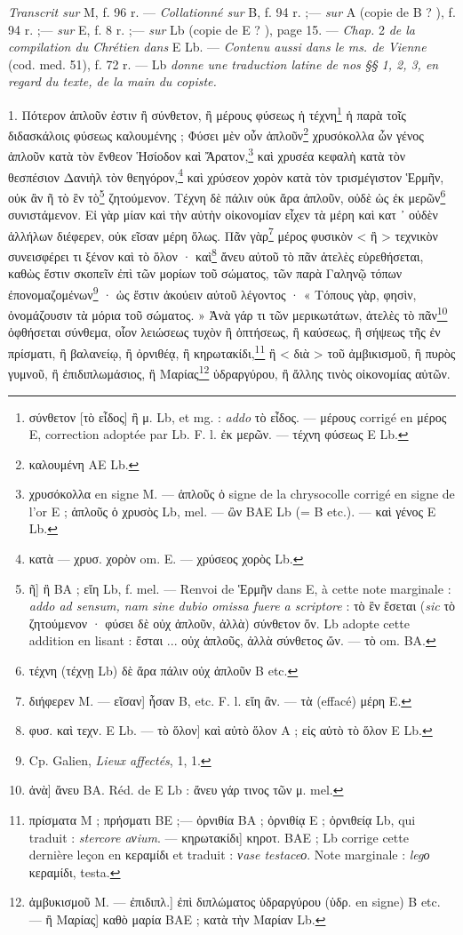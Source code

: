 \documentclass[a4paper, 11pt, oneside, polutonikogreek, french]{article}
\begin{document}
\emph{Transcrit sur} M, f. 96 r. --- \emph{Collationné sur} B, f. 94 r. ;--- \emph{sur} A (copie de B ? ), f. 94 r. ;--- \emph{sur} E, f. 8 r. ;--- \emph{sur} Lb (copie de E ? ), page 15. --- \emph{Chap.} 2 \emph{de la compilation du Chrétien dans} E Lb. --- \emph{Contenu aussi dans le ms. de Vienne} (cod. med. 51), f. 72 r. --- Lb \emph{donne une traduction latine de nos §§ 1, 2, 3, en regard du texte, de la main du copiste.}

1. Πότερον ἁπλοῦν ἐστιν ἢ σύνθετον, ἢ μέρους φύσεως ἡ τέχνη\footnote{σύνθετον [τὸ εἶδος] ἢ μ. Lb, et mg. : \emph{addo} τὸ εἶδος. --- μέρους corrigé en μέρος E, correction adoptée par Lb. F. l. ἐκ μερῶν. --- τέχνη φύσεως E Lb.} ἡ παρὰ τοῖς διδασκάλοις φύσεως καλουμένης ; Φύσει μὲν οὖν ἁπλοῦν\footnote{καλουμένη AE Lb.} χρυσόκολλα ὦν γένος ἀπλοῦν κατὰ τὸν ἔνθεον Ἡσίοδον καὶ Ἄρατον,\footnote{χρυσόκολλα en signe M. --- ἁπλοῦς ὁ signe de la chrysocolle corrigé en signe de l'or E ; ἁπλοῦς ὁ χρυσὸς Lb, mel. --- ὢν BAE Lb (= B etc.). --- καὶ γένος E Lb.} καὶ χρυσέα κεφαλὴ κατὰ τὸν θεσπέσιον Δανιὴλ τὸν θεηγόρον,\footnote{κατὰ --- χρυσ. χορὸν om. E. --- χρύσεος χορὸς Lb.} καὶ χρύσεον χορὸν κατὰ τὸν τρισμέγιστον Ἑρμῆν, οὐκ ἂν ῆ τὸ ἓν τὸ\footnote{ῆ] ἢ BA ; εἴη Lb, f. mel. --- Renvoi de Ἑρμῆν dans E, à cette note marginale : \emph{addo ad sensum, nam sine dubio omissa fuere a scriptore} : τὸ ἓν ἔσεται (\emph{sic} τὸ ζητούμενον · φύσει δὲ οὐχ ἁπλοῦν, ἀλλὰ) σύνθετον ὄν. Lb adopte cette addition en lisant : ἔσται ... οὐχ ἁπλοῦς, ἀλλὰ σύνθετος ὤν. --- τὸ om. BA.} ζητούμενον. Τέχνη δὲ πάλιν οὐκ ἄρα ἁπλοῦν, οὐδὲ ὡς ἐκ μερῶν\footnote{τέχνη (τέχνῃ Lb) δὲ ἄρα πάλιν οὐχ ἁπλοῦν B etc.} συνιστάμενον. Εἰ γὰρ μίαν καὶ τὴν αὐτὴν οἰκονομίαν εἶχεν τὰ μέρη καὶ κατ ᾽ οὐδὲν ἀλλήλων διέφερεν, οὐκ εῖσαν μέρη ὅλως. Πᾶν γὰρ\footnote{διήφερεν M. --- εῖσαν] ἦσαν B, etc. F. l. εἴη ἂν. --- τὰ (effacé) μέρη E.} μέρος φυσικὸν < ἢ > τεχνικὸν συνεισφέρει τι ξένον καὶ τὸ ὅλον · καὶ\footnote{φυσ. καὶ τεχν. E Lb. --- τὸ ὅλον] καὶ αὐτὸ ὅλον A ; εἰς αὐτὸ τὸ ὅλον E Lb.} ἄνευ αὐτοῦ τὸ πᾶν ἀτελὲς εὑρεθήσεται, καθὼς ἔστιν σκοπεῖν ἐπὶ τῶν μορίων τοῦ σώματος, τῶν παρὰ Γαληνῷ τόπων ἐπονομαζομένων\footnote{Cp. Galien, \emph{Lieux affectés}, 1, 1.} · ὡς ἔστιν ἀκούειν αὐτοῦ λέγοντος · « Τόπους γὰρ, φησὶν, ὀνομάζουσιν τὰ μόρια τοῦ σώματος. » Ἀνὰ γάρ τι τῶν μερικωτάτων, ἀτελὲς τὸ πᾶν\footnote{ἀνὰ] ἄνευ BA. Réd. de E Lb : ἄνευ γάρ τινος τῶν μ. mel.} ὀφθήσεται σύνθεμα, οἷον λειώσεως τυχὸν ἢ ὀπτήσεως, ἢ καύσεως, ἢ σήψεως τῆς ἐν πρίσματι, ἢ βαλανείῳ, ἢ ὀρνιθέᾳ, ἢ κηρωτακίδι,\footnote{πρίσματα M ; πρήσματι BE ;--- ὀρνιθία BA ; ὀρνιθίᾳ E ; ὀρνιθείᾳ Lb, qui traduit : \emph{stercore aνium}. --- κηρωτακίδι] κηροτ. BAE ; Lb corrige cette dernière leçon en κεραμίδι et traduit : \emph{νase testaceο}. Note marginale : \emph{legο} κεραμίδι, testa.} ἢ < διὰ > τοῦ ἀμβικισμοῦ, ἢ πυρὸς γυμνοῦ, ἢ ἐπιδιπλωμάσιος, ἢ Μαρίας\footnote{ἀμβυκισμοῦ M. --- ἐπιδιπλ.] ἐπὶ διπλώματος ὑδραργύρου (ὑδρ. en signe) B etc. --- ἢ Μαρίας] καθὸ μαρία BAE ; κατὰ τὴν Mαρίαν Lb.} ὑδραργύρου, ἢ ἄλλης τινὸς οἰκονομίας αὐτῶν.
\end{document}
